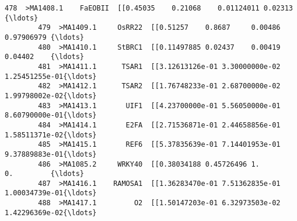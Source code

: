 \documentclass[11pt]{article}
\begin{document}
\begin{Verbatim}[commandchars=\\\{\}]
        478  >MA1408.1    FaEOBII  [[0.45035    0.21068    0.01124011 0.02313    {\ldots}   
        479  >MA1409.1     OsRR22  [[0.51257    0.8687     0.00486    0.97906979 {\ldots}   
        480  >MA1410.1     StBRC1  [[0.11497885 0.02437    0.00419    0.04402    {\ldots}   
        481  >MA1411.1      TSAR1  [[3.12613126e-01 3.30000000e-02 1.25451255e-01{\ldots}   
        482  >MA1412.1      TSAR2  [[1.76748233e-01 2.68700000e-02 1.99798002e-02{\ldots}   
        483  >MA1413.1       UIF1  [[4.23700000e-01 5.56050000e-01 8.60790000e-01{\ldots}   
        484  >MA1414.1       E2FA  [[2.71536871e-01 2.44658856e-01 1.58511371e-02{\ldots}   
        485  >MA1415.1       REF6  [[5.37835639e-01 7.14401953e-01 9.37889883e-01{\ldots}   
        486  >MA1085.2     WRKY40  [[0.38034188 0.45726496 1.         0.         {\ldots}   
        487  >MA1416.1    RAMOSA1  [[1.36283470e-01 7.51362835e-01 1.00034739e-01{\ldots}   
        488  >MA1417.1         O2  [[1.50147203e-01 6.32973503e-02 1.42296369e-02{\ldots}   
        

\end{Verbatim}
\end{document}
